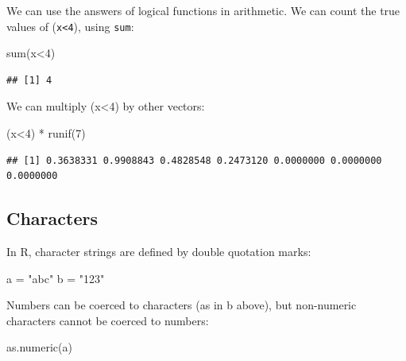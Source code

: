 \documentclass[
]{book}
\newenvironment{Shaded}{\begin{snugshade}}{\end{snugshade}}
\newcommand{\DecValTok}[1]{\textcolor[rgb]{0.00,0.00,0.81}{#1}}
\newcommand{\FunctionTok}[1]{\textcolor[rgb]{0.00,0.00,0.00}{#1}}
\newcommand{\NormalTok}[1]{#1}
\newcommand{\OtherTok}[1]{\textcolor[rgb]{0.56,0.35,0.01}{#1}}
\newcommand{\SpecialCharTok}[1]{\textcolor[rgb]{0.00,0.00,0.00}{#1}}
\newcommand{\StringTok}[1]{\textcolor[rgb]{0.31,0.60,0.02}{#1}}
\begin{document}
We can use the answers of logical functions in arithmetic. We can count the true values of (\texttt{x\textless{}4}), using \texttt{sum}:

\begin{Shaded}
\begin{Highlighting}[]
\FunctionTok{sum}\NormalTok{(x}\SpecialCharTok{\textless{}}\DecValTok{4}\NormalTok{)}
\end{Highlighting}
\end{Shaded}

\begin{verbatim}
## [1] 4
\end{verbatim}

We can multiply (x\textless4) by other vectors:

\begin{Shaded}
\begin{Highlighting}[]
\NormalTok{(x}\SpecialCharTok{\textless{}}\DecValTok{4}\NormalTok{) }\SpecialCharTok{*} \FunctionTok{runif}\NormalTok{(}\DecValTok{7}\NormalTok{)}
\end{Highlighting}
\end{Shaded}

\begin{verbatim}
## [1] 0.3638331 0.9908843 0.4828548 0.2473120 0.0000000 0.0000000 0.0000000
\end{verbatim}

\hypertarget{characters}{%
\subsection{Characters}\label{characters}}

In R, character strings are defined by double quotation marks:

\begin{Shaded}
\begin{Highlighting}[]
\NormalTok{a }\OtherTok{=} \StringTok{"abc"}
\NormalTok{b }\OtherTok{=} \StringTok{"123"}
\end{Highlighting}
\end{Shaded}

Numbers can be coerced to characters (as in b above), but non-numeric characters cannot be coerced to
numbers:

\begin{Shaded}
\begin{Highlighting}[]
\FunctionTok{as.numeric}\NormalTok{(a)}
\end{Highlighting}
\end{Shaded}
\end{document}
